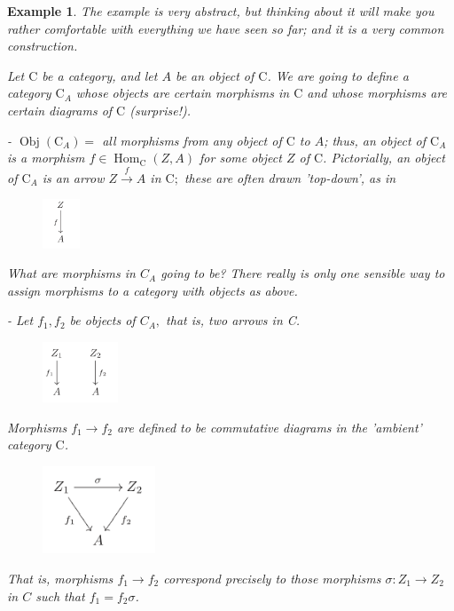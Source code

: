 \documentclass[12pt]{book}
\theoremstyle{definition}\newtheorem{dfn}{Définition}[chapter]
\theoremstyle{plain}\newtheorem{thm}{Théorème}[chapter]
\theoremstyle{plain}\newtheorem{prp}{Proposition}[chapter]
\theoremstyle{plain}\newtheorem{lem}{\bf Lemme}[chapter]
\theoremstyle{plain}\newtheorem{axm}{\bf Axiome}[chapter]
\theoremstyle{plain}\newtheorem{lmm}{\bf Lemme}[chapter]
\theoremstyle{plain}\newtheorem{exm}{\bf Example}[chapter]
\theoremstyle{plain}\newtheorem{cor}{\bf Corollaire}[chapter]
\theoremstyle{remark}\newtheorem{rem}{Remarque}[chapter]
\begin{document}
\begin{exm}
The example is very abstract, but thinking about it will make you rather comfortable with everything we have seen so far; and it is a very common construction.

Let $\mathrm{C}$ be a category, and let $A$ be an object of $\mathrm{C}$. We are going to define a category $\mathrm{C}_{A}$ whose objects are certain morphisms in $\mathrm{C}$ and whose morphisms are certain diagrams of $\mathrm{C}$ (surprise!).

- $\operatorname{Obj}\left(\mathrm{C}_{A}\right)=$ all morphisms from any object of $\mathrm{C}$ to $A$; thus, an object of $\mathrm{C}_{A}$ is a morphism $f \in \operatorname{Hom}_{\mathrm{C}}(Z, A)$ for some object $Z$ of $\mathrm{C}$. Pictorially, an object of $\mathrm{C}_{A}$ is an arrow $Z \stackrel{f}{\rightarrow} A$ in $\mathrm{C} ;$ these are often drawn 'top-down', as in
\begin{figure}[H]\centering\includegraphics[width=0.1\textwidth]{image//Vocabulaire de theorie des ensembles//6}\end{figure}
What are morphisms in $C_{A}$ going to be? There really is only one sensible way to assign morphisms to a category with objects as above.

- Let $f_{1}, f_{2}$ be objects of $C_{A},$ that is, two arrows in C. 
\begin{figure}[H]\centering\includegraphics[width=0.2\textwidth]{image//Vocabulaire de theorie des ensembles//7}\end{figure}
Morphisms $f_{1} \rightarrow f_{2}$ are defined to be commutative diagrams in the 'ambient' category $\mathrm{C}$.
\begin{figure}[H]\centering\includegraphics[width=0.3\textwidth]{image//Vocabulaire de theorie des ensembles//8}\end{figure}
That is, morphisms $f_{1} \rightarrow f_{2}$ correspond precisely to those morphisms $\sigma: Z_{1} \rightarrow Z_{2}$ in $C$ such that $f_{1}=f_{2} \sigma$.


\end{exm}
\end{document}
